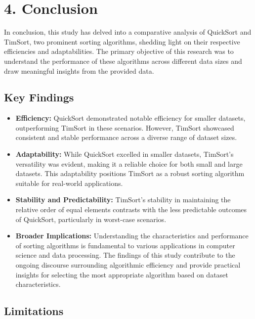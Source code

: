 \documentclass[a4paper, 9pt, twocolumn]{article}
\begin{document}
\section*{4. Conclusion}

In conclusion, this study has delved into a comparative analysis of QuickSort and TimSort, two prominent sorting algorithms, shedding light on their respective efficiencies and adaptabilities. The primary objective of this research was to understand the performance of these algorithms across different data sizes and draw meaningful insights from the provided data.

\subsection*{Key Findings}

\begin{itemize}
	\item \textbf{Efficiency:} QuickSort demonstrated notable efficiency for smaller datasets, outperforming TimSort in these scenarios. However, TimSort showcased consistent and stable performance across a diverse range of dataset sizes.

	\item \textbf{Adaptability:} While QuickSort excelled in smaller datasets, TimSort's versatility was evident, making it a reliable choice for both small and large datasets. This adaptability positions TimSort as a robust sorting algorithm suitable for real-world applications.

	\item \textbf{Stability and Predictability:} TimSort's stability in maintaining the relative order of equal elements contrasts with the less predictable outcomes of QuickSort, particularly in worst-case scenarios.

	\item \textbf{Broader Implications:} Understanding the characteristics and performance of sorting algorithms is fundamental to various applications in computer science and data processing. The findings of this study contribute to the ongoing discourse surrounding algorithmic efficiency and provide practical insights for selecting the most appropriate algorithm based on dataset characteristics.
\end{itemize}

\subsection*{Limitations}
\end{document}
